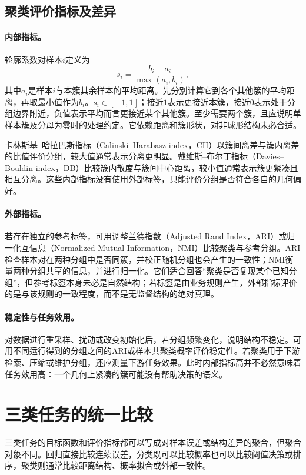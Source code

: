 \subsection{聚类评价指标及差异}
\paragraph{内部指标。}
轮廓系数对样本$i$定义为
\begin{equation}
 s_i=\frac{b_i-a_i}{\max(a_i,b_i)},
 \label{eq:clustering-silhouette}
\end{equation}
其中$a_i$是样本$i$与本簇其余样本的平均距离。先分别计算它到各个其他簇的平均距离，再取最小值作为$b_i$。$s_i\in[-1,1]$；接近$1$表示更接近本簇，接近$0$表示处于分组边界附近，负值表示平均而言更接近某个其他簇。至少需要两个簇，且应说明单样本簇及分母为零时的处理约定。它依赖距离和簇形状，对非球形结构未必合适。

卡林斯基--哈拉巴斯指标（Calinski--Harabasz index，CH）以簇间离差与簇内离差的比值评价分组，较大值通常表示分离更明显。戴维斯--布尔丁指标（Davies--Bouldin index，DB）比较簇内散度与簇间中心距离，较小值通常表示簇更紧凑且相互分离。这些内部指标没有使用外部标签，只能评价分组是否符合各自的几何偏好。

\paragraph{外部指标。}
若存在独立的参考标签，可用调整兰德指数（Adjusted Rand Index，ARI）或归一化互信息（Normalized Mutual Information，NMI）比较聚类与参考分组。ARI检查样本对在两种分组中是否同簇，并校正随机分组也会产生的一致性；NMI衡量两种分组共享的信息，并进行归一化。它们适合回答“聚类是否复现某个已知分组”，但参考标签本身未必是自然结构；若标签是由业务规则产生，外部指标评价的是与该规则的一致程度，而不是无监督结构的绝对真理。

\paragraph{稳定性与任务效用。}
对数据进行重采样、扰动或改变初始化后，若分组频繁变化，说明结构不稳定。可用不同运行得到的分组之间的ARI或样本共聚类概率评价稳定性。若聚类用于下游检索、压缩或维护分组，还应测量下游任务效果。此时内部指标高并不必然意味着任务效用高：一个几何上紧凑的簇可能没有帮助决策的语义。

\section{三类任务的统一比较}
三类任务的目标函数和评价指标都可以写成对样本误差或结构差异的聚合，但聚合对象不同。回归直接比较连续误差，分类既可以比较概率也可以比较阈值决策或排序，聚类则通常比较距离结构、概率拟合或外部一致性。


